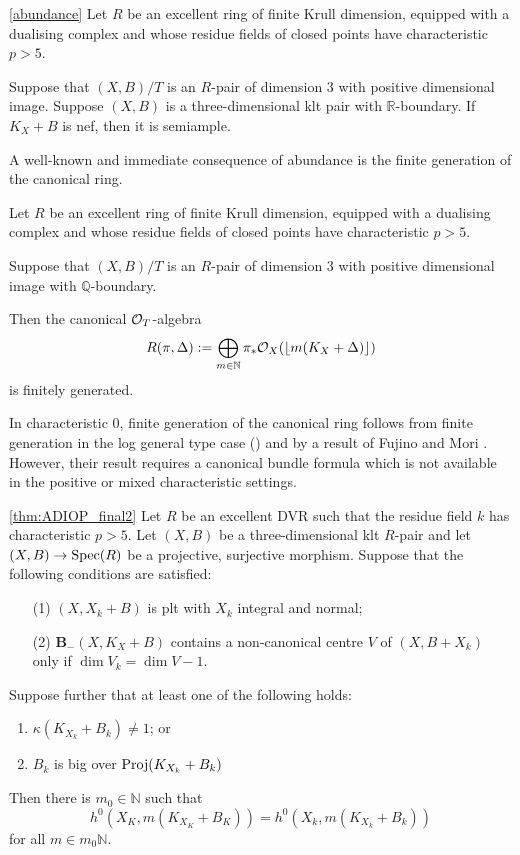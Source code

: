 	\begin{theorem}\label{Main_Abund1}\autoref{abundance}
		Let $R$ be an excellent ring of finite Krull dimension, equipped with a dualising complex and whose residue fields of closed points have characteristic $p>5$.
		
		Suppose that $(X,B)/T$ is an $R$-pair of dimension $3$ with positive dimensional image.
		Suppose $(X,B)$ is a three-dimensional klt pair with $\mathbb{R}$-boundary. If $K_X+B$ is nef, then it is semiample.
	\end{theorem}

	

	A well-known and immediate consequence of abundance is the finite generation of the canonical ring.
	
	\begin{theorem}
		Let $R$ be an excellent ring of finite Krull dimension, equipped with a dualising complex and whose residue fields of closed points have characteristic $p>5$.
		
		Suppose that $(X,B)/T$ is an $R$-pair of dimension $3$ with positive dimensional image with $\mathbb{Q}$-boundary. 
		
		Then the canonical $\ox[T]$-algebra
		\[R(\pi,\Delta):=\bigoplus_{m \in \mathbb{N}} \pi_{*}\ox(\lfloor m(K_{X}+\Delta)\rfloor)\]
		is finitely generated.
	\end{theorem}

	In characteristic $0$, finite generation of the canonical ring follows from finite generation in the log general type case (\cite{BCHM10}) and by a result of Fujino and Mori \cite[Theorem 5.2]{FM00}. However, their result requires a canonical bundle formula which is not available in the positive or mixed characteristic settings.


	\begin{theorem}\label{Main_Abund2}\autoref{thm:ADIOP_final2}
		Let $R$ be an excellent DVR such that the residue field $k$ has characteristic $p>5$.
		Let $(X,B)$ be a three-dimensional klt $R$-pair and let $(X,B)\to \Spec(R)$ be a projective, surjective morphism.  Suppose that the following conditions are satisfied:
		
		\begin{enumerate}
		\item[(1)] $(X,X_{k}+B)$ is plt with $X_k$ integral and normal;
		\item[(2)] ${\mathbf{B}_{-}(X, K_{X}+B)}$ contains a non-canonical centre $V$ of $(X,B+X_{k})$ only if $\dim V_{k}=\dim V -1$.
		\end{enumerate}
		
		Suppose further that at least one of the following holds:
		\begin{enumerate}
			\item $\kappa(K_{X_{k}}+B_{k}) \neq 1$; or
			\item $B_{k}$ is big over $\textup{Proj}(K_{X_{k}}+B_{k})$
		\end{enumerate}	
		Then there is $m_{0} \in \mathbb{N}$ such that 
		$$h^{0}(X_{K},m(K_{X_{K}}+B_{K}))=h^{0}(X_{k},m(K_{X_{k}}+B_{k}))$$
		for all $m \in m_{0}\mathbb{N}$.
		
	\end{theorem}

